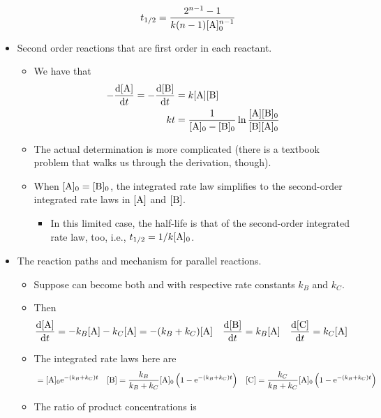 \documentclass[../notes.tex]{subfiles}
\begin{document}
\begin{itemize}
\begin{itemize}
\begin{align*}
            t_{1/2} &= \frac{2^{n-1}-1}{k(n-1)[\ce{A}]_0^{n-1}}
        \end{align*}
    \end{itemize}
    \item Second order reactions that are first order in each reactant.
    \begin{itemize}
        \item We have that
        \begin{align*}
            -\dv{[\ce{A}]}{t} = -\dv{[\ce{B}]}{t} &= k[\ce{A}][\ce{B}]\\
            kt &= \frac{1}{[\ce{A}]_0-[\ce{B}]_0}\ln\frac{[\ce{A}][\ce{B}]_0}{[\ce{B}][\ce{A}]_0}
        \end{align*}
        \item The actual determination is more complicated (there is a textbook problem that walks us through the derivation, though).
        \item When $[\ce{A}]_0=[\ce{B}]_0$, the integrated rate law simplifies to the second-order integrated rate laws in $[\ce{A}]$ and $[\ce{B}]$.
        \begin{itemize}
            \item In this limited case, the half-life is that of the second-order integrated rate law, too, i.e., $t_{1/2}=1/k[\ce{A}]_0$.
        \end{itemize}
    \end{itemize}
    \item The reaction paths and mechanism for parallel reactions.
    \begin{itemize}
        \item Suppose  can become both  and  with respective rate constants $k_B$ and $k_C$.
        \item Then
        \begin{align*}
            \dv{[\ce{A}]}{t} &= -k_B[\ce{A}]-k_C[\ce{A}] = -(k_B+k_C)[\ce{A}]&
            \dv{[\ce{B}]}{t} &= k_B[\ce{A}]&
            \dv{[\ce{C}]}{t} &= k_C[\ce{A}]
        \end{align*}
        \item The integrated rate laws here are
        \begin{align*}
            [\ce{A}] &= [\ce{A}]_0\e[-(k_B+k_C)t]&
            [\ce{B}] &= \frac{k_B}{k_B+k_C}[\ce{A}]_0\left( 1-\e[-(k_B+k_C)t] \right)&
            [\ce{C}] &= \frac{k_C}{k_B+k_C}[\ce{A}]_0\left( 1-\e[-(k_B+k_C)t] \right)
        \end{align*}
        \item The ratio of product concentrations is

\end{itemize}
\end{itemize}
\end{document}
